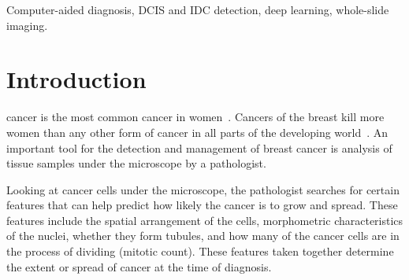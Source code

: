 \documentclass[journal]{IEEEtran}
\begin{document}
\begin{IEEEkeywords}
Computer-aided diagnosis, DCIS and IDC detection, deep learning, whole-slide imaging.
\end{IEEEkeywords}






%
\IEEEpeerreviewmaketitle


\section{Introduction}
% 
% 
% 
% 
 cancer is the most common cancer in women~\cite{cancerstats}. Cancers of the breast kill more women than any other form of cancer in all parts of the developing world~\cite{bcstats}. An important tool for the detection and management of breast cancer is analysis of tissue samples under the microscope by a pathologist.

Looking at cancer cells under the microscope, the pathologist searches for certain features that can help predict how likely the cancer is to grow and spread. These features include the spatial arrangement of the cells, morphometric characteristics of the nuclei, whether they form tubules, and how many of the cancer cells are in the process of dividing (mitotic count). These features taken together determine the extent or spread of cancer at the time of diagnosis.
\end{document}
